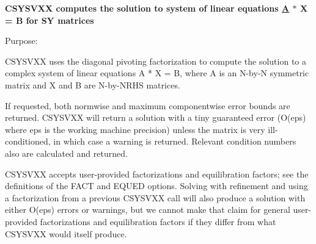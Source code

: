 {\bfseries  C\+S\+Y\+S\+V\+X\+X computes the solution to system of linear equations \hyperlink{classA}{A} $\ast$ X = B for S\+Y matrices} 

 \begin{DoxyParagraph}{Purpose\+: }
\begin{DoxyVerb}    CSYSVXX uses the diagonal pivoting factorization to compute the
    solution to a complex system of linear equations A * X = B, where
    A is an N-by-N symmetric matrix and X and B are N-by-NRHS
    matrices.

    If requested, both normwise and maximum componentwise error bounds
    are returned. CSYSVXX will return a solution with a tiny
    guaranteed error (O(eps) where eps is the working machine
    precision) unless the matrix is very ill-conditioned, in which
    case a warning is returned. Relevant condition numbers also are
    calculated and returned.

    CSYSVXX accepts user-provided factorizations and equilibration
    factors; see the definitions of the FACT and EQUED options.
    Solving with refinement and using a factorization from a previous
    CSYSVXX call will also produce a solution with either O(eps)
    errors or warnings, but we cannot make that claim for general
    user-provided factorizations and equilibration factors if they
    differ from what CSYSVXX would itself produce.\end{DoxyVerb}
 
\end{DoxyParagraph}
